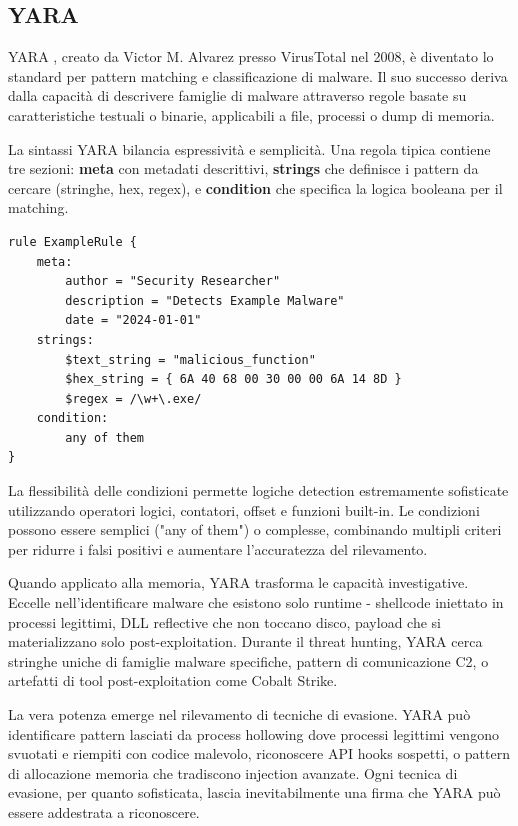 \subsection{YARA}

YARA \cite{yara2024}, creato da Victor M. Alvarez presso VirusTotal nel 2008, è diventato lo standard per pattern matching e classificazione di malware. Il suo successo deriva dalla capacità di descrivere famiglie di malware attraverso regole basate su caratteristiche testuali o binarie, applicabili a file, processi o dump di memoria.

La sintassi YARA bilancia espressività e semplicità. Una regola tipica contiene tre sezioni: \textbf{meta} con metadati descrittivi, \textbf{strings} che definisce i pattern da cercare (stringhe, hex, regex), e \textbf{condition} che specifica la logica booleana per il matching. 

\begin{verbatim}
rule ExampleRule {
    meta:
        author = "Security Researcher"
        description = "Detects Example Malware"
        date = "2024-01-01" 
    strings:
        $text_string = "malicious_function"
        $hex_string = { 6A 40 68 00 30 00 00 6A 14 8D }
        $regex = /\w+\.exe/
    condition:
        any of them
}
\end{verbatim}

La flessibilità delle condizioni permette logiche detection estremamente sofisticate utilizzando operatori logici, contatori, offset e funzioni built-in. Le condizioni possono essere semplici ("any of them") o complesse, combinando multipli criteri per ridurre i falsi positivi e aumentare l'accuratezza del rilevamento.

Quando applicato alla memoria, YARA trasforma le capacità investigative. Eccelle nell'identificare malware che esistono solo runtime - shellcode iniettato in processi legittimi, DLL reflective che non toccano disco, payload che si materializzano solo post-exploitation. Durante il threat hunting, YARA cerca stringhe uniche di famiglie malware specifiche, pattern di comunicazione C2, o artefatti di tool post-exploitation come Cobalt Strike.

La vera potenza emerge nel rilevamento di tecniche di evasione. YARA può identificare pattern lasciati da process hollowing dove processi legittimi vengono svuotati e riempiti con codice malevolo, riconoscere API hooks sospetti, o pattern di allocazione memoria che tradiscono injection avanzate. Ogni tecnica di evasione, per quanto sofisticata, lascia inevitabilmente una firma che YARA può essere addestrata a riconoscere.

